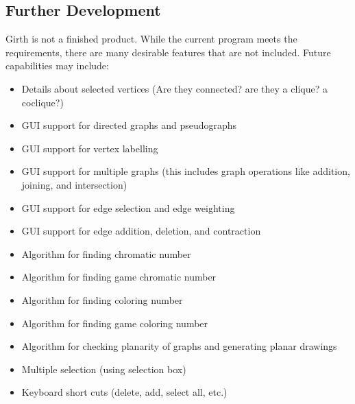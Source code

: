 \documentclass{article}
\begin{document}
\subsection{Further Development}

Girth is not a finished product. While the current program meets the requirements,
there are many desirable features that are not included.
Future capabilities may include:
\begin{itemize}
  \item Details about selected vertices (Are they connected? are they a clique? a coclique?)
  \item GUI support for directed graphs and pseudographs
  \item GUI support for vertex labelling
  \item GUI support for multiple graphs (this includes graph operations like addition, joining, and intersection)
  \item GUI support for edge selection and edge weighting
  \item GUI support for edge addition, deletion, and contraction
  \item Algorithm for finding chromatic number
  \item Algorithm for finding game chromatic number
  \item Algorithm for finding coloring number
  \item Algorithm for finding game coloring number
  \item Algorithm for checking planarity of graphs and generating planar drawings
  \item Multiple selection (using selection box)
  \item Keyboard short cuts (delete, add, select all, etc.)
\end{itemize}
\end{document}
